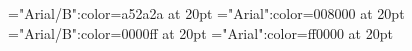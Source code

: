 \documentclass[a4paper]{article}
\begin{document}
 
\thispagestyle{empty} 
\font\tdtbta="Arial/B":color=a52a2a at 20pt
\font\tctbta="Arial":color=008000 at 20pt
\font\tbta="Arial/B":color=0000ff at 20pt
\font\ta="Arial":color=ff0000 at 20pt






\end{document}

